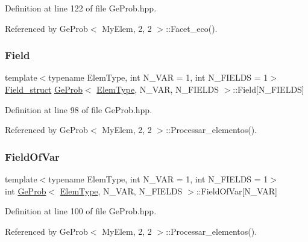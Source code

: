 Definition at line 122 of file Ge\+Prob.\+hpp.



Referenced by Ge\+Prob$<$ My\+Elem, 2, 2 $>$\+::\+Facet\+\_\+eco().

\mbox{\label{classGeProb_aaaeb3e022301e2df5e180af7900a352e}} 
\subsubsection{\texorpdfstring{Field}{Field}}
{\footnotesize\ttfamily template$<$typename Elem\+Type, int N\+\_\+\+V\+AR = 1, int N\+\_\+\+F\+I\+E\+L\+DS = 1$>$ \\
\hyperlink{structField__struct}{Field\+\_\+struct} \hyperlink{classGeProb}{Ge\+Prob}$<$ \hyperlink{spectral_8h_aaa2c1a7b2d1b12c590d730fe6ac839fa}{Elem\+Type}, N\+\_\+\+V\+AR, N\+\_\+\+F\+I\+E\+L\+DS $>$\+::Field\mbox{[}N\+\_\+\+F\+I\+E\+L\+DS\mbox{]}\hspace{0.3cm}{\ttfamily [protected]}}



Definition at line 98 of file Ge\+Prob.\+hpp.



Referenced by Ge\+Prob$<$ My\+Elem, 2, 2 $>$\+::\+Processar\+\_\+elementos().

\mbox{\label{classGeProb_a520a47a06c38cfe59938d2bbd65773a2}} 
\subsubsection{\texorpdfstring{Field\+Of\+Var}{FieldOfVar}}
{\footnotesize\ttfamily template$<$typename Elem\+Type, int N\+\_\+\+V\+AR = 1, int N\+\_\+\+F\+I\+E\+L\+DS = 1$>$ \\
int \hyperlink{classGeProb}{Ge\+Prob}$<$ \hyperlink{spectral_8h_aaa2c1a7b2d1b12c590d730fe6ac839fa}{Elem\+Type}, N\+\_\+\+V\+AR, N\+\_\+\+F\+I\+E\+L\+DS $>$\+::Field\+Of\+Var\mbox{[}N\+\_\+\+V\+AR\mbox{]}\hspace{0.3cm}{\ttfamily [protected]}}



Definition at line 100 of file Ge\+Prob.\+hpp.



Referenced by Ge\+Prob$<$ My\+Elem, 2, 2 $>$\+::\+Processar\+\_\+elementos().

